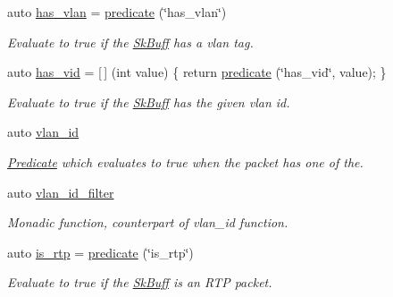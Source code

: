 \begin{DoxyCompactItemize}
auto \hyperlink{namespacepfq_1_1lang_1_1anonymous__namespace_02default_8hpp_03_a1f0378ddfa90777d11ffae5fbb57b4e0}{has\+\_\+vlan} = \hyperlink{namespacepfq_1_1lang_aca9adafc436b7f851621b979fa1aaf88}{predicate} (\char`\"{}has\+\_\+vlan\char`\"{})
\begin{DoxyCompactList}\small\item\em Evaluate to {\ttfamily true} if the \hyperlink{structpfq_1_1lang_1_1SkBuff}{Sk\+Buff} has a vlan tag. \end{DoxyCompactList}\item 
auto \hyperlink{namespacepfq_1_1lang_1_1anonymous__namespace_02default_8hpp_03_a99c204d8095fdccd50d4cb24d32e5b5b}{has\+\_\+vid} = \mbox{[}$\,$\mbox{]} (int value) \{ return \hyperlink{namespacepfq_1_1lang_aca9adafc436b7f851621b979fa1aaf88}{predicate} (\char`\"{}has\+\_\+vid\char`\"{}, value); \}
\begin{DoxyCompactList}\small\item\em Evaluate to {\ttfamily true} if the \hyperlink{structpfq_1_1lang_1_1SkBuff}{Sk\+Buff} has the given vlan id. \end{DoxyCompactList}\item 
auto \hyperlink{namespacepfq_1_1lang_1_1anonymous__namespace_02default_8hpp_03_ad2a631020f34bf10335ebb0e79f03920}{vlan\+\_\+id}
\begin{DoxyCompactList}\small\item\em \hyperlink{structpfq_1_1lang_1_1Predicate}{Predicate} which evaluates to {\ttfamily true} when the packet has one of the. \end{DoxyCompactList}\item 
auto \hyperlink{namespacepfq_1_1lang_1_1anonymous__namespace_02default_8hpp_03_ab843ad210e98a7c8a4218efaf60f8c01}{vlan\+\_\+id\+\_\+filter}
\begin{DoxyCompactList}\small\item\em Monadic function, counterpart of {\ttfamily vlan\+\_\+id} function. \end{DoxyCompactList}\item 
auto \hyperlink{namespacepfq_1_1lang_1_1anonymous__namespace_02default_8hpp_03_afef6f6217cb5e1bc0a8d1c88dbab0307}{is\+\_\+rtp} = \hyperlink{namespacepfq_1_1lang_aca9adafc436b7f851621b979fa1aaf88}{predicate} (\char`\"{}is\+\_\+rtp\char`\"{})
\begin{DoxyCompactList}\small\item\em Evaluate to {\ttfamily true} if the \hyperlink{structpfq_1_1lang_1_1SkBuff}{Sk\+Buff} is an R\+TP packet. \end{DoxyCompactList}\item 

\end{DoxyCompactItemize}
